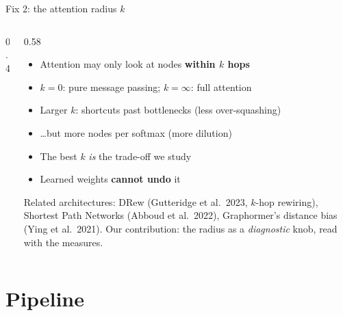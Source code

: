 \documentclass[aspectratio=169,10pt]{beamer}
\newcommand{\snote}[1]{{\scriptsize\textcolor{ink!70}{#1}}}
\begin{document}
\begin{frame}{Fix 2: the attention radius $k$}
  \begin{columns}[c]
    \begin{column}{0.4\textwidth}
      \centering
    \end{column}
    \begin{column}{0.58\textwidth}
      \begin{itemize}
        \item Attention may only look at nodes \textbf{within $k$ hops}
        \item $k=0$: pure message passing; $k=\infty$: full attention
        \item Larger $k$: shortcuts past bottlenecks (\textcolor{good}{less over-squashing})
        \item \ldots but more nodes per softmax (\alert{more dilution})
        \item The best $k$ \emph{is} the trade-off we study
        \item Learned weights \textbf{cannot undo} it
      \end{itemize}
      \snote{Related architectures: DRew (Gutteridge et al.\ 2023, $k$-hop rewiring), Shortest Path Networks (Abboud et al.\ 2022), Graphormer's distance bias (Ying et al.\ 2021). Our contribution: the radius as a \emph{diagnostic} knob, read with the measures.}
    \end{column}
  \end{columns}
\end{frame}

\section{Pipeline}
\end{document}
